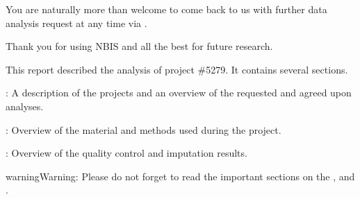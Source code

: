 \documentclass[letterpaper,10pt,english]{sphinxmanual}
\begin{document}
You are naturally more than welcome to come back to us with further data analysis request at any time via .

Thank you for using NBIS and all the best for future research.

This report described the analysis of project \#5279. It contains several sections.

{\hyperref[\detokenize{content/project_description::doc}]{}}: A description of the projects and an overview of the requested and agreed upon analyses.

{\hyperref[\detokenize{content/material_methods::doc}]{}}: Overview of the material and methods used during the project.

{\hyperref[\detokenize{content/results::doc}]{}}: Overview of the quality control and imputation results.

\begin{sphinxadmonition}{warning}{Warning:}
Please do not forget to read the important sections on the {\hyperref[\detokenize{content/acknowledgements::doc}]{}}, {\hyperref[\detokenize{content/data_responsability::doc}]{}} and {\hyperref[\detokenize{content/closing::doc}]{}}.
\end{sphinxadmonition}



\renewcommand{\indexname}{Index}
\printindex
\end{document}
